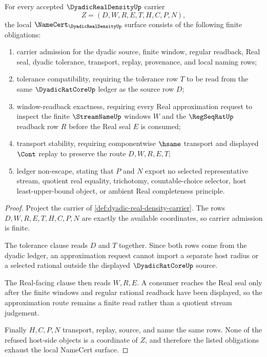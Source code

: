 \begin{theorem}
\label{thm:dyadic-real-density-namecert-obligations}
For every accepted $\DyadicRealDensityUp$ carrier
$$
Z=(D,W,R,E,T,H,C,P,N),
$$
the local $\NameCert_{\DyadicRealDensityUp}$ surface consists of the following finite obligations:
\begin{enumerate}
\item carrier admission for the dyadic source, finite window, regular readback, Real seal, dyadic tolerance, transport, replay, provenance, and local naming rows;
\item tolerance compatibility, requiring the tolerance row $T$ to be read from the same $\DyadicRatCoreUp$ ledger as the source row $D$;
\item window-readback exactness, requiring every Real approximation request to inspect the finite $\StreamNameUp$ windows $W$ and the $\RegSeqRatUp$ readback row $R$ before the Real seal $E$ is consumed;
\item transport stability, requiring componentwise $\hsame$ transport and displayed $\Cont$ replay to preserve the route $D,W,R,E,T$;
\item ledger non-escape, stating that $P$ and $N$ export no selected representative stream, quotient real equality, trichotomy, countable-choice selector, host least-upper-bound object, or ambient Real completeness principle.
\end{enumerate}
\end{theorem}
\begin{proof}
Project the carrier of \autoref{def:dyadic-real-density-carrier}. The rows $D,W,R,E,T,H,C,P,N$ are exactly the available coordinates, so carrier admission is finite.

The tolerance clause reads $D$ and $T$ together. Since both rows come from the dyadic ledger, an approximation request cannot import a separate host radius or a selected rational outside the displayed $\DyadicRatCoreUp$ source.

The Real-facing clause then reads $W,R,E$. A consumer reaches the Real seal only after the finite windows and regular rational readback have been displayed, so the approximation route remains a finite read rather than a quotient stream judgement.

Finally $H,C,P,N$ transport, replay, source, and name the same rows. None of the refused host-side objects is a coordinate of $Z$, and therefore the listed obligations exhaust the local NameCert surface.
\end{proof}

